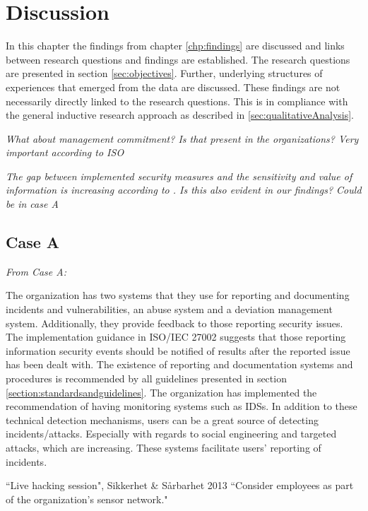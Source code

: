 \chapter{Discussion}
\label{chp:discussion}
In this chapter the findings from chapter \ref{chp:findings} are discussed and links between research questions and findings are established. The research questions are presented in section \ref{sec:objectives}. Further, underlying structures of experiences that emerged from the data are discussed. These findings are not necessarily directly linked to the research questions. This is in compliance with the general inductive research approach as described in \ref{sec:qualitativeAnalysis}.  



\textit{What about management commitment? Is that present in the organizations? Very important according to ISO}

\textit{The gap between implemented security measures and the sensitivity and value of information is increasing according to \cite{Morketall2012}. Is this also evident in our findings? Could be in case A}

\textit{  }

\section{Case A}
\textit{From Case A:}

The organization has two systems that they use for reporting and documenting incidents and vulnerabilities, an abuse system and a deviation management system. Additionally, they provide feedback to those reporting security issues. The implementation guidance in ISO/IEC 27002 suggests that those reporting information security events should be notified of results after the reported issue has been dealt with. The existence of reporting and documentation systems and procedures is recommended by all guidelines presented in section \ref{section:standardsandguidelines}. The organization has implemented the recommendation of having monitoring systems such as IDSs. In addition to these technical detection mechanisms, users can be a great source of detecting incidents/attacks. Especially with regards to social engineering and targeted attacks, which are increasing. These systems facilitate users' reporting of incidents. 

\begin{newquote}{``Live hacking session", Sikkerhet \& S\aa rbarhet 2013}
``Consider employees as part of the organization's sensor network."
\end{newquote}

